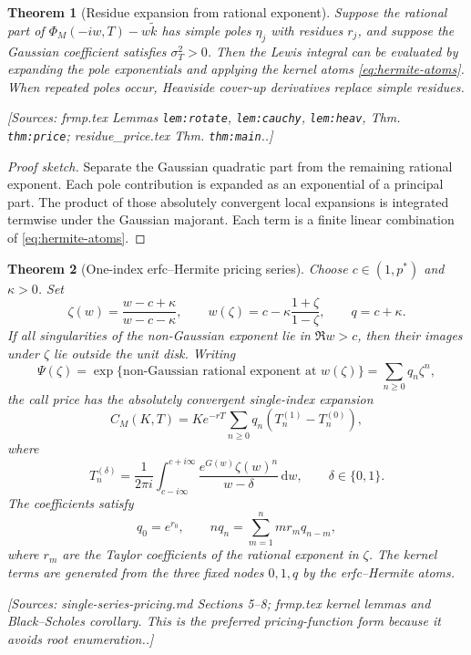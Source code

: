 \documentclass[11pt]{article}
\newtheorem{theorem}{Theorem}[section]
\theoremstyle{definition}
\newcommand{\dd}{\,\mathrm{d}}
\newcommand{\Source}[1]{\par\smallskip\noindent\textup{[Sources: #1.]}}
\begin{document}
\begin{theorem}[Residue expansion from rational exponent]\label{thm:residue-price}
Suppose the rational part of $\Phi_M(-iw,T)-w\tilde k$ has simple poles $\eta_j$ with residues $r_j$,
and suppose the Gaussian coefficient satisfies $\sigma_T^2>0$.
Then the Lewis integral can be evaluated by expanding the pole exponentials and applying the kernel atoms \eqref{eq:hermite-atoms}.
When repeated poles occur,
Heaviside cover-up derivatives replace simple residues.
\Source{frmp.tex Lemmas \texttt{lem:rotate}, \texttt{lem:cauchy}, \texttt{lem:heav}, Thm. \texttt{thm:price}; residue\_price.tex Thm. \texttt{thm:main}.}
\end{theorem}

\begin{proof}[Proof sketch]
Separate the Gaussian quadratic part from the remaining rational exponent.
Each pole contribution is expanded as an exponential of a principal part.
The product of those absolutely convergent local expansions is integrated termwise under the Gaussian majorant.
Each term is a finite linear combination of \eqref{eq:hermite-atoms}.
\end{proof}

\begin{theorem}[One-index erfc--Hermite pricing series]\label{thm:single-series}
Choose $c\in(1,p^*)$ and $\kappa>0$.
Set
\begin{equation}\label{eq:cayley}
        \zeta(w)=\frac{w-c+\kappa}{w-c-\kappa},
        \qquad
        w(\zeta)=c-\kappa\frac{1+\zeta}{1-\zeta},
        \qquad q=c+\kappa.
\end{equation}
If all singularities of the non-Gaussian exponent lie in $\Re w>c$,
then their images under $\zeta$ lie outside the unit disk.
Writing
\begin{equation}\label{eq:q-series}
        \Psi(\zeta)=\exp\{\text{non-Gaussian rational exponent at }w(\zeta)\}
        =\sum_{n\ge0}q_n\zeta^n,
\end{equation}
the call price has the absolutely convergent single-index expansion
\begin{equation}\label{eq:single-price}
        C_M(K,T)=Ke^{-rT}\sum_{n\ge0}q_n\left(T_n^{(1)}-T_n^{(0)}\right),
\end{equation}
where
\begin{equation}\label{eq:Tn-delta}
        T_n^{(\delta)}=\frac1{2\pi i}\int_{c-i\infty}^{c+i\infty}
        \frac{e^{G(w)}\zeta(w)^n}{w-\delta}\dd w,
        \qquad \delta\in\{0,1\}.
\end{equation}
The coefficients satisfy
\begin{equation}\label{eq:exp-series-rec}
        q_0=e^{r_0},
        \qquad
        nq_n=\sum_{m=1}^n m r_m q_{n-m},
\end{equation}
where $r_m$ are the Taylor coefficients of the rational exponent in $\zeta$.
The kernel terms are generated from the three fixed nodes $0,1,q$ by the erfc--Hermite atoms.
\Source{single-series-pricing.md Sections 5--8; frmp.tex kernel lemmas and Black--Scholes corollary. This is the preferred pricing-function form because it avoids root enumeration.}
\end{theorem}
\end{document}
